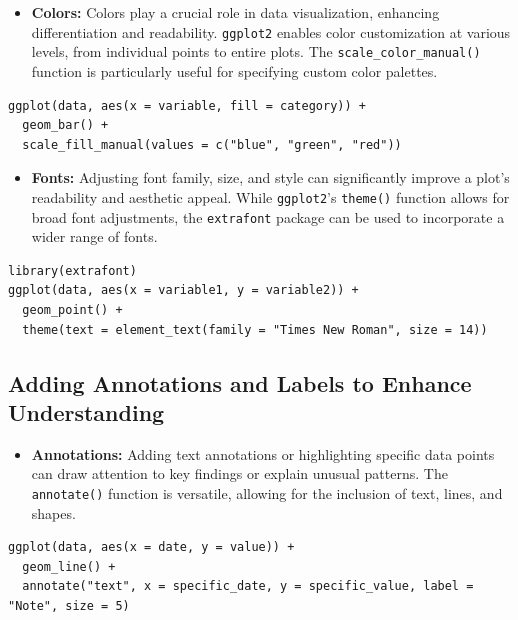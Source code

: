 \documentclass[
]{book}
\providecommand{\tightlist}{%
  \setlength{\itemsep}{0pt}\setlength{\parskip}{0pt}}
\begin{document}
\begin{itemize}
\tightlist
\item
  \textbf{Colors:} Colors play a crucial role in data visualization, enhancing differentiation and readability. \texttt{ggplot2} enables color customization at various levels, from individual points to entire plots. The \texttt{scale\_color\_manual()} function is particularly useful for specifying custom color palettes.
\end{itemize}

\begin{verbatim}
ggplot(data, aes(x = variable, fill = category)) + 
  geom_bar() +
  scale_fill_manual(values = c("blue", "green", "red"))
\end{verbatim}

\begin{itemize}
\tightlist
\item
  \textbf{Fonts:} Adjusting font family, size, and style can significantly improve a plot's readability and aesthetic appeal. While \texttt{ggplot2}'s \texttt{theme()} function allows for broad font adjustments, the \texttt{extrafont} package can be used to incorporate a wider range of fonts.
\end{itemize}

\begin{verbatim}
library(extrafont)
ggplot(data, aes(x = variable1, y = variable2)) + 
  geom_point() +
  theme(text = element_text(family = "Times New Roman", size = 14))
\end{verbatim}

\hypertarget{adding-annotations-and-labels-to-enhance-understanding}{%
\subsection{Adding Annotations and Labels to Enhance Understanding}\label{adding-annotations-and-labels-to-enhance-understanding}}

\begin{itemize}
\tightlist
\item
  \textbf{Annotations:} Adding text annotations or highlighting specific data points can draw attention to key findings or explain unusual patterns. The \texttt{annotate()} function is versatile, allowing for the inclusion of text, lines, and shapes.
\end{itemize}

\begin{verbatim}
ggplot(data, aes(x = date, y = value)) + 
  geom_line() +
  annotate("text", x = specific_date, y = specific_value, label = "Note", size = 5)
\end{verbatim}
\end{document}
